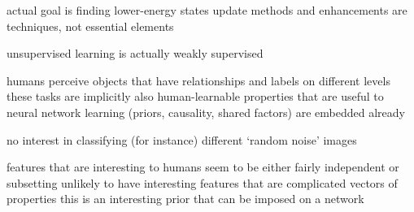 \documentclass[citeauthoryear]{llncs}
\begin{document}
    actual goal is finding lower-energy states
      update methods and enhancements are techniques, not essential elements



unsupervised learning is actually weakly supervised 

  humans perceive objects that have relationships and labels on different levels
    these tasks are implicitly also human-learnable
    properties that are useful to neural network learning (priors, causality, shared factors) are embedded already
    
  no interest in classifying (for instance) different `random noise' images
  
  features that are interesting to humans seem to be either fairly independent or subsetting
    unlikely to have interesting features that are complicated vectors of properties
    this is an interesting prior that can be imposed on a network
\end{document}
